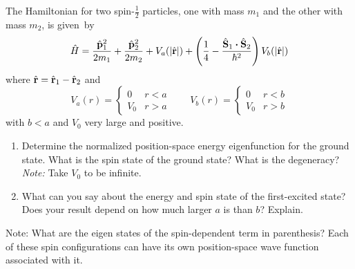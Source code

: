 \documentclass[11pt]{hmcpset}
\begin{document}
\begin{problem}
	
	The Hamiltonian for two spin-$\frac{1}{2}$ particles, one with mass $m_1$ and the other with
	mass $m_2$, is given~by
	\[
	\hat {H} = \frac{\hat {\bf p}_{1}^{2}}{2m_{1}} + \frac{\hat
		{\bf p}_{2}^{2}}{2m_{2}} + V_{a} ( | \hat {\bf r} |
	) + \left( \frac{1}{4} - \frac{\hat {\bf S}_{1} \boldsymbol{\cdot} \hat{\bf S}_{2}
	}{\hbar^{2}} \right)V_{b} (|\hat{\bf r}|)
	\]
	where $\hat{\bf r} = \hat{\bf r}_1 - \hat{\bf r}_{2}$ and
	\[
	V_{a} (r) =
	\begin{cases}
	0  & r < a \\
	V_{0} & r > a
	\end{cases}\qquad
	V_{b} (r) =
	\begin{cases}
	0 & r < b \\
	V_{0} & r > b
	\end{cases}
	\]
	with $b < a$ and $V_0$ very large and positive.
	
	
	\begin{enumerate}
		\item[(a)] Determine the normalized position-space energy eigenfunction for the
		ground state. What is the spin state of the ground state? What is
		the degeneracy? \textit{Note:} Take $V_0$ to be infinite.
		
		\item[(b)] What can you say about the energy and spin state of the first-excited
		state? Does your result depend on how much larger $a$ is than $b$? Explain.
	\end{enumerate}
	
	Note: What are the eigen states of the spin-dependent term in parenthesis? Each of these spin configurations can have its own position-space wave function associated with it.
	
\end{problem}
\begin{solution}
	\vfill
\end{solution}
\pagebreak

\end{document}
